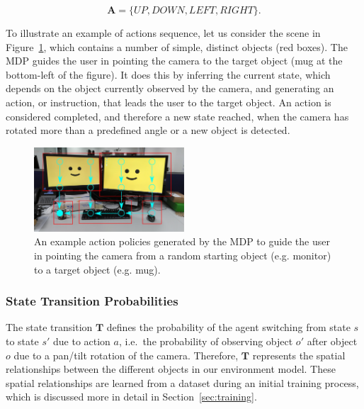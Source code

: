\documentclass[a4paper, twoside]{article}
\begin{document}
\begin{equation}
  \mathbf{A} = \{UP, DOWN, LEFT, RIGHT\}.
\end{equation}

To illustrate an example of actions sequence, let us consider the scene in Figure~\ref{fig:route-example}, which contains a number of simple, distinct objects (red boxes). The MDP guides the user in pointing the camera to the target object (mug at the bottom-left of the figure). It does this by inferring the current state, which depends on the object currently observed by the camera, and generating an action, or instruction, that leads the user to the target object.
An action is considered completed, and therefore a new state reached, when the camera has rotated more than a predefined angle or a new object is detected.

\begin{figure}
  \centering
  \includegraphics[width=0.5\textwidth]{figures/office_desk_example.png}
  \caption{An example action policies generated by the MDP to guide the user in pointing the camera from a random starting object (e.g. monitor) to a target object (e.g. mug). }\label{fig:route-example}
\end{figure}

\subsubsection{State Transition Probabilities}

\noindent The state transition $\mathbf{T}$ defines the probability of the agent switching from state $s$ to state $s'$ due to action $a$, i.e.\ the probability of observing object $o'$ after object $o$ due to a pan/tilt rotation of the camera. Therefore, $\mathbf{T}$ represents the spatial relationships between the different objects in our environment model. 
% 
These spatial relationships are learned from a dataset during an initial training process, which is discussed more in detail in Section~\ref{sec:training}.
\end{document}
